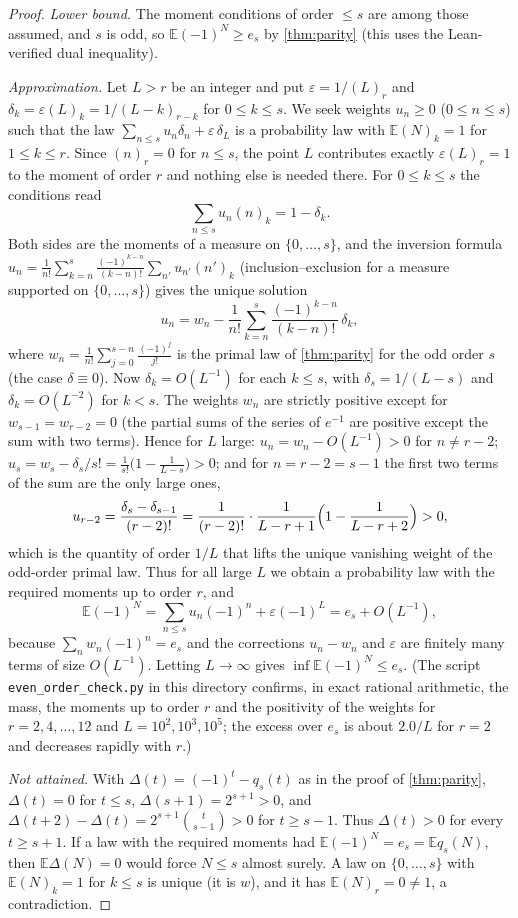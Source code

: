 \documentclass[11pt]{article}
\newcommand{\Ex}{\mathbb E}
\begin{document}
\begin{proof}
\emph{Lower bound.} The moment conditions of order $\le s$ are among those assumed, and $s$ is odd, so $\Ex(-1)^N\ge e_s$ by \cref{thm:parity} (this uses the Lean-verified dual inequality).

\emph{Approximation.} Let $L>r$ be an integer and put $\varepsilon=1/(L)_r$ and $\delta_k=\varepsilon(L)_k=1/(L-k)_{r-k}$ for $0\le k\le s$. We seek weights $u_n\ge0$ ($0\le n\le s$) such that the law $\sum_{n\le s}u_n\delta_n+\varepsilon\,\delta_L$ is a probability law with $\Ex(N)_k=1$ for $1\le k\le r$. Since $(n)_r=0$ for $n\le s$, the point $L$ contributes exactly $\varepsilon(L)_r=1$ to the moment of order $r$ and nothing else is needed there. For $0\le k\le s$ the conditions read
\[
\sum_{n\le s}u_n(n)_k=1-\delta_k.
\]
Both sides are the moments of a measure on $\{0,\dots,s\}$, and the inversion formula $u_n=\frac1{n!}\sum_{k=n}^s\frac{(-1)^{k-n}}{(k-n)!}\sum_{n'}u_{n'}(n')_k$ (inclusion--exclusion for a measure supported on $\{0,\dots,s\}$) gives the unique solution
\[
u_n=w_n-\frac1{n!}\sum_{k=n}^s\frac{(-1)^{k-n}}{(k-n)!}\,\delta_k,
\]
where $w_n=\frac1{n!}\sum_{j=0}^{s-n}\frac{(-1)^j}{j!}$ is the primal law of \cref{thm:parity} for the odd order $s$ (the case $\delta\equiv0$). Now $\delta_k=O(L^{-1})$ for each $k\le s$, with $\delta_s=1/(L-s)$ and $\delta_k=O(L^{-2})$ for $k<s$. The weights $w_n$ are strictly positive except for $w_{s-1}=w_{r-2}=0$ (the partial sums of the series of $e^{-1}$ are positive except the sum with two terms). Hence for $L$ large: $u_n=w_n-O(L^{-1})>0$ for $n\ne r-2$; $u_s=w_s-\delta_s/s!=\frac1{s!}\bigl(1-\frac1{L-s}\bigr)>0$; and for $n=r-2=s-1$ the first two terms of the sum are the only large ones,
\[
u_{r-2}=\frac{\delta_s-\delta_{s-1}}{(r-2)!}=\frac1{(r-2)!}\cdot\frac1{L-r+1}\Bigl(1-\frac1{L-r+2}\Bigr)>0,
\]
which is the quantity of order $1/L$ that lifts the unique vanishing weight of the odd-order primal law. Thus for all large $L$ we obtain a probability law with the required moments up to order $r$, and
\[
\Ex(-1)^N=\sum_{n\le s}u_n(-1)^n+\varepsilon(-1)^L=e_s+O(L^{-1}),
\]
because $\sum_nw_n(-1)^n=e_s$ and the corrections $u_n-w_n$ and $\varepsilon$ are finitely many terms of size $O(L^{-1})$. Letting $L\to\infty$ gives $\inf\Ex(-1)^N\le e_s$. (The script \texttt{even\_order\_check.py} in this directory confirms, in exact rational arithmetic, the mass, the moments up to order $r$ and the positivity of the weights for $r=2,4,\dots,12$ and $L=10^2,10^3,10^5$; the excess over $e_s$ is about $2.0/L$ for $r=2$ and decreases rapidly with $r$.)

\emph{Not attained.} With $\Delta(t)=(-1)^t-q_s(t)$ as in the proof of \cref{thm:parity}, $\Delta(t)=0$ for $t\le s$, $\Delta(s+1)=2^{s+1}>0$, and $\Delta(t+2)-\Delta(t)=2^{s+1}\binom t{s-1}>0$ for $t\ge s-1$. Thus $\Delta(t)>0$ for every $t\ge s+1$. If a law with the required moments had $\Ex(-1)^N=e_s=\Ex q_s(N)$, then $\Ex\Delta(N)=0$ would force $N\le s$ almost surely. A law on $\{0,\dots,s\}$ with $\Ex(N)_k=1$ for $k\le s$ is unique (it is $w$), and it has $\Ex(N)_r=0\ne1$, a contradiction.
\end{proof}
\end{document}
